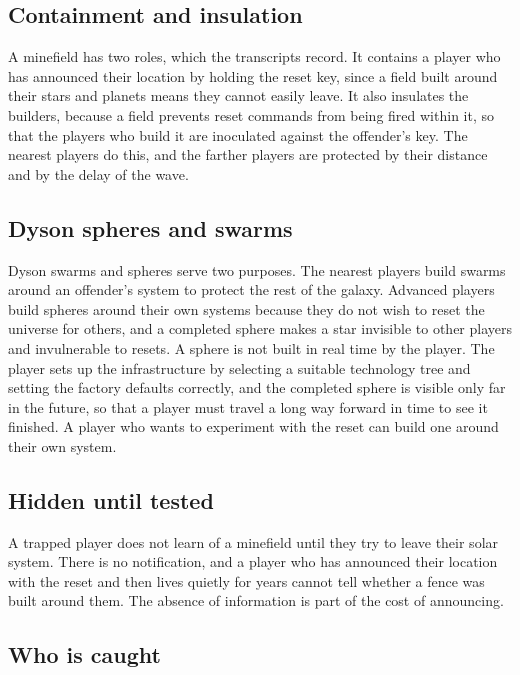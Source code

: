 \documentclass[11pt]{article}
\begin{document}
\subsection{Containment and insulation}

A minefield has two roles, which the transcripts record. It contains a player who has announced their location by holding the reset key, since a field built around their stars and planets means they cannot easily leave. It also insulates the builders, because a field prevents reset commands from being fired within it, so that the players who build it are inoculated against the offender's key. The nearest players do this, and the farther players are protected by their distance and by the delay of the wave.

\subsection{Dyson spheres and swarms}

Dyson swarms and spheres serve two purposes. The nearest players build swarms around an offender's system to protect the rest of the galaxy. Advanced players build spheres around their own systems because they do not wish to reset the universe for others, and a completed sphere makes a star invisible to other players and invulnerable to resets. A sphere is not built in real time by the player. The player sets up the infrastructure by selecting a suitable technology tree and setting the factory defaults correctly, and the completed sphere is visible only far in the future, so that a player must travel a long way forward in time to see it finished. A player who wants to experiment with the reset can build one around their own system.

\subsection{Hidden until tested}

A trapped player does not learn of a minefield until they try to leave their solar system. There is no notification, and a player who has announced their location with the reset and then lives quietly for years cannot tell whether a fence was built around them. The absence of information is part of the cost of announcing.

\subsection{Who is caught}
\end{document}
